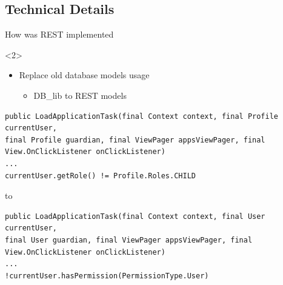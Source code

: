 \subsection{Technical Details}
\begin{frame}[fragile]{How was REST implemented}

\begin{onlyenv}<2>
\begin{itemize}
  \item Replace old database models usage
    \begin{itemize}
  \item DB\_lib to REST models
\end{itemize}
\end{itemize}
\begin{center}
\begin{minipage}[H]{0.9\linewidth}
\begin{lstlisting}
public LoadApplicationTask(final Context context, final Profile currentUser,
final Profile guardian, final ViewPager appsViewPager, final View.OnClickListener onClickListener)
...
currentUser.getRole() != Profile.Roles.CHILD 
\end{lstlisting} 

to

\begin{lstlisting}    
public LoadApplicationTask(final Context context, final User currentUser,
final User guardian, final ViewPager appsViewPager, final View.OnClickListener onClickListener)
...
!currentUser.hasPermission(PermissionType.User)
\end{lstlisting} 
\end{minipage}
\end{center}
\end{onlyenv}


\end{frame}
